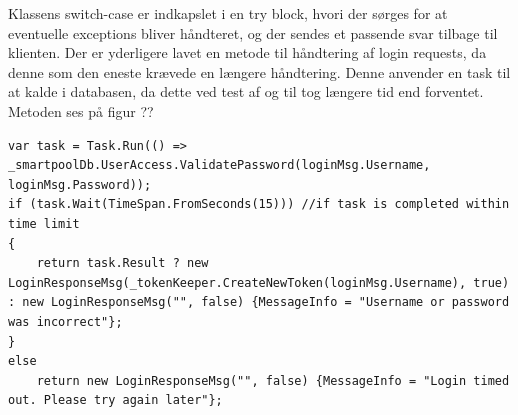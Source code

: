 Klassens switch-case er indkapslet i en try block, hvori der sørges for at eventuelle exceptions bliver håndteret, og der sendes et passende svar tilbage til klienten. Der er yderligere lavet en metode til håndtering af login requests, da denne som den eneste krævede en længere håndtering. Denne anvender en task til at kalde i databasen, da dette ved test af og til tog længere tid end forventet. Metoden ses på figur ??

\begin{lstlisting}[caption=Server.ResponseManager.HandleLoginRequest, label=code:Server.ResponseManager.HandleLoginRequest]
var task = Task.Run(() => _smartpoolDb.UserAccess.ValidatePassword(loginMsg.Username, loginMsg.Password));
if (task.Wait(TimeSpan.FromSeconds(15))) //if task is completed within time limit
{
	return task.Result ? new LoginResponseMsg(_tokenKeeper.CreateNewToken(loginMsg.Username), true) : new LoginResponseMsg("", false) {MessageInfo = "Username or password was incorrect"};
}
else
	return new LoginResponseMsg("", false) {MessageInfo = "Login timed out. Please try again later"};
\end{lstlisting}

